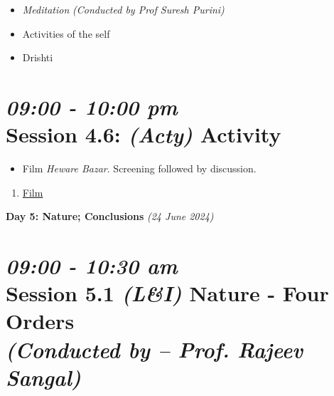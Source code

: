 \documentclass[11pt]{article}
\begin{document}
    \begin{itemize}
        \item {\em Meditation}  {\em (Conducted by Prof Suresh Purini) }    %
        \item Activities of the self
        \item Drishti
    \end{itemize}

    \section*{{\it 09:00 - 10:00 pm} \\
    Session 4.6: {\it (Acty)} Activity}

    \begin{itemize}
        \item Film {\em Heware Bazar}. Screening followed by discussion.
    \end{itemize}

    \begin{enumerate}
        \item \href{https://www.youtube.com/watch?v=G8bQ8d1ePNw}{Film}
    \end{enumerate}


    \begin{center}
        \vspace{10mm}
        {\LARGE {\bf Day 5: Nature; Conclusions} {\em (24 June 2024)} }\\
    \end{center}


    \section*{{\it 09:00 - 10:30 am} \\
    Session 5.1 {\it (L\&I)} {\bf Nature - Four Orders} \\
    {\Large\it (Conducted by -- Prof. Rajeev Sangal)}}
\end{document}
